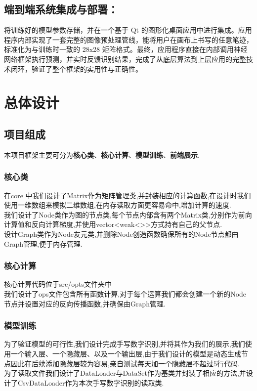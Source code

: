\documentclass{ctexart} %
\begin{document}
\subsection{端到端系统集成与部署：}

将训练好的模型参数存储，并在一个基于 Qt 的图形化桌面应用中进行集成。应用程序内部实现了一套完整的图像预处理管线，能将用户在画布上书写的任意笔迹，标准化为与训练时一致的 28x28 矩阵格式。最终，应用程序直接在内部调用神经网络框架执行预测，并实时反馈识别结果，完成了从底层算法到上层应用的完整技术闭环，验证了整个框架的实用性与正确性。\\

\section{总体设计}
\subsection{项目组成}
本项目框架主要可分为\textbf{核心类}、\textbf{核心计算}、\textbf{模型训练}、\textbf{前端展示}.
\subsubsection{核心类}
在core 中我们设计了Matrix作为矩阵管理类,并封装相应的计算函数,在设计时我们使用一维数组来模拟二维数组,在内存读取方面更容易命中,增加计算的速度.\\
我们设计了Node类作为图的节点类,每个节点内部含有两个Matrix类,分别作为前向计算值和反向计算梯度,并使用vector<weak<>>方式持有自己的父节点.\\
设计Graph类作为Node友元类,并删除Node创造函数确保所有的Node节点都由Graph管理,便于内存管理.
\subsubsection{核心计算}
核心计算代码位于src/opts文件夹中\\
我们设计了ops文件包含所有函数计算,对于每个运算我们都会创建一个新的Node节点并设置对应的反向传播函数,并确保由Graph管理.\\
\subsubsection{模型训练}
为了验证模型的可行性,我们设计完成手写数字识别,并将其作为我们的展示,我们使用一个输入层、一个隐藏层、以及一个输出层,由于我们设计的模型是动态生成节点因此在后续添加隐藏层较为容易,亲自测试每天加一个隐藏层不超过5行代码.\\
为了读取文件我们设计了DataLoader与DataSet作为基类并封装了相应的方法,并设计了CsvDataLoader作为本次手写数字识别的读取类.
\end{document}
